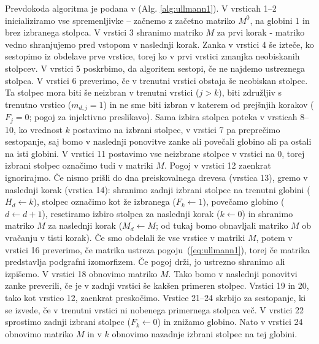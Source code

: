 \documentclass[a4paper, 12pt, ]{book}
\newcommand{\refalg}[1]{(Alg. \ref{#1})}
\begin{document}
	Prevdokoda algoritma je podana v \refalg{alg:ullmann1}. V vrsticah 1--2 inicializiramo vse spremenljivke -- začnemo z začetno matriko $M^0$, 
	na globini 1 in brez izbranega stolpca. V vrstici 3 shranimo matriko $M$ za prvi korak - matriko vedno shranjujemo pred vstopom v naslednji korak. 	
	Zanka v vrstici 4 še izteče, ko sestopimo iz obdelave prve vrstice, torej ko v prvi vrstici zmanjka neobiskanih stolpcev. V vrstici 5 poskrbimo, da 
	algoritem sestopi, če ne najdemo ustreznega stolpca. V vrstici 6 preverimo, če v trenutni vrstici obstaja še neobiskan stolpec. Ta stolpec mora biti še
	neizbran v trenutni vrstici ($j > k$), biti združljiv s trenutno vrstico ($m_{d,j} = 1$) in ne sme biti izbran v	katerem od prejšnjih korakov ($F_j=0$;
	pogoj za injektivno preslikavo). Sama izbira stolpca poteka v vrsticah 8--10, ko vrednost $k$ postavimo na izbrani stolpec, v vrstici 7 pa preprečimo 
	sestopanje, saj bomo v naslednji ponovitve zanke ali povečali globino ali pa ostali na isti globini.
	V vrstici 11 postavimo vse neizbrane stolpce v vrstici na $0$, torej izbrani stolpec označimo tudi v matriki $M$. Pogoj v vrstici 12 zaenkrat ignorirajmo.
	Če nismo prišli do dna preiskovalnega
	drevesa (vrstica 13), gremo v naslednji korak (vrstica 14): shranimo zadnji izbrani stolpec na trenutni globini ($H_d \gets k$), stolpec označimo kot
	že izbranega ($F_k \gets 1$), povečamo globino ($d \gets d + 1$), resetiramo izbiro stolpca za naslednji korak ($k \gets 0$) in shranimo matriko $M$
	za naslednji korak ($M_d \gets M$; od tukaj bomo obnavljali matriko $M$ ob vračanju v tisti korak).
	Če smo obdelali že vse vrstice v matriki $M$, potem v vrstici 16 preverimo, če matrika ustreza pogoju~(\ref{eq:ullmann1}), torej če matrika predstavlja
	podgrafni izomorfizem. Če pogoj drži, jo ustrezno shranimo ali izpišemo. V vrstici 18 obnovimo matriko $M$. Tako bomo
	v naslednji ponovitvi zanke preverili, če je v zadnji vrstici še kakšen primeren stolpec. Vrstici 19 in 20, tako kot vrstico 12, zaenkrat preskočimo.
	Vrstice 21--24 skrbijo za sestopanje, ki se izvede, če v trenutni 
	vrstici ni nobenega primernega stolpca več. V vrstici 22 sprostimo zadnji izbrani stolpec ($F_k \gets 0$) in znižamo globino. Nato v vrstici 24 obnovimo
	matriko $M$ in v $k$ obnovimo nazadnje izbrani stolpec na tej globini.
	
\end{document}

